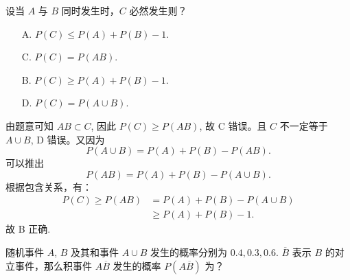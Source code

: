 \documentclass[12pt, a4paper, oneside, UTF8]{ctexbook}
\begin{document}
\begin{example}
    设当 \(A\) 与 \(B\) 同时发生时，\(C\) 必然发生则？
     
    \vspace{0.5cm}

    \begin{minipage}[l]{0.45\textwidth}
        \begin{enumerate}
            \item[A.] \(P\left(C\right)\leqslant P\left(A\right) + P\left(B\right) - 1\).
            \item[C.] \(P\left(C\right) = P\left(AB\right)\).
        \end{enumerate}
    \end{minipage}
    \begin{minipage}[c]{0.45\textwidth}
        \begin{enumerate}
            \item[B.] \(P\left(C\right)\geqslant P\left(A\right) + P\left(B\right) - 1\).
            \item[D.] \(P\left(C\right) = P\left(A \cup B\right)\).
        \end{enumerate}
    \end{minipage}
\end{example}

\begin{solution}
    由题意可知 \(AB \subset C\), 因此 \(P\left(C\right) \geqslant P\left(AB\right)\), 故 C 错误。且 \(C\) 不一定等于 \(A \cup B\), D 错误。又因为 \[P\left(A \cup B\right) = P\left(A\right) + P\left(B\right) - P\left(AB\right).\]
    可以推出\[P\left(AB\right) = P\left(A\right) + P\left(B\right) - P\left(A \cup B\right).\]
    根据包含关系，有：
    \begin{align*}
        P\left(C\right)\geqslant P\left(AB\right) &= P\left(A\right) + P\left(B\right) - P\left(A \cup B\right)\\
        &\geqslant P\left(A\right) + P\left(B\right) - 1.
    \end{align*}
    故 B 正确.
\end{solution}

\begin{example}
    随机事件 \(A\), \(B\) 及其和事件 \(A\cup B\) 发生的概率分别为 \(0.4 , 0.3 , 0.6\). \(\overline{B}\) 表示 \(B\) 的对立事件，那么积事件 \(A \overline{B}\) 发生的概率 \(P\left(A\overline{B}\right)\) 为？
\end{example}
\end{document}
